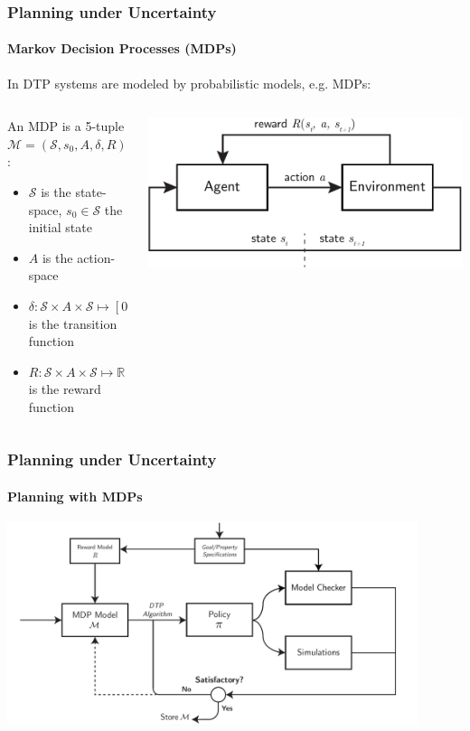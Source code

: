 \begin{frame}
	\frametitle{Planning under Uncertainty}
	\framesubtitle{Markov Decision Processes (MDPs)}
	
	In DTP systems are modeled by probabilistic models, e.g. MDPs:
	\begin{columns}[T]
		\begin{column}{0.6\textwidth}
			\begin{definition}
				An MDP is a 5-tuple $\mathcal{M} = (\mathcal{S}, s_0, A, \delta, R)$:
				\begin{itemize}
					\item $\mathcal{S}$ is the state-space, $s_0 \in \mathcal{S}$ the initial state
					\item $A$ is the action-space
					\item $\delta: \mathcal{S} \times A \times \mathcal{S} \mapsto [0, 1]$ is the transition function %
					\item $R: \mathcal{S} \times A \times \mathcal{S} \mapsto \mathbb{R}$ is the reward function
				\end{itemize}
			\end{definition}
		\end{column}
		\begin{column}{0.425\textwidth}
			\vspace{26pt}
			\includegraphics[width=\linewidth]{figures/mdp-2v2}
		\end{column}
	\end{columns}
\end{frame}

\begin{frame}
	\frametitle{Planning under Uncertainty}
	\framesubtitle{Planning with MDPs}
	\begin{center}
	\includegraphics[width=0.9\textwidth]{figures/mdp-planning-diagram-v32-cropped}
\end{center}
\end{frame}

